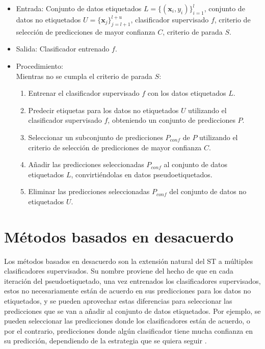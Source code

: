 \begin{algo}[Autoentrenamiento]
    \mbox{}
    \begin{itemize}
    \item Entrada: Conjunto de datos etiquetados $L = \{(\mathbf{x}_i, y_i)\}_{i=1}^l$, conjunto de datos no etiquetados $U = \{\mathbf{x}_j\}_{j=l+1}^{l+u}$, clasificador supervisado $f$, criterio de selección de predicciones de mayor confianza $C$, criterio de parada $S$.
    \item Salida: Clasificador entrenado $f$.
    \item Procedimiento:
        \\Mientras no se cumpla el criterio de parada $S$:
        \begin{enumerate}
            \item Entrenar el clasificador supervisado $f$ con los datos etiquetados $L$.
            \item Predecir etiquetas para los datos no etiquetados $U$ utilizando el clasificador supervisado $f$, obteniendo un conjunto de predicciones $P$.
            \item Seleccionar un subconjunto de predicciones $P_{conf}$ de $P$ utilizando el criterio de selección de predicciones de mayor confianza $C$.
            \item Añadir las predicciones seleccionadas $P_{conf}$ al conjunto de datos etiquetados $L$, convirtiéndolas en datos pseudoetiquetados.
            \item Eliminar las predicciones seleccionadas $P_{conf}$ del conjunto de datos no etiquetados $U$.
        \end{enumerate}
    \end{itemize}
\end{algo}

\section{Métodos basados en desacuerdo}

Los métodos basados en desacuerdo son la extensión natural del \gls{ST} a múltiples clasificadores supervisados. Su nombre proviene del hecho de que en cada iteración del pseudoetiquetado, una vez entrenados los clasificadores supervisados, estos no necesariamente están de acuerdo en sus predicciones para los datos no etiquetados, y se pueden aprovechar estas diferencias para seleccionar las predicciones que se van a añadir al conjunto de datos etiquetados. Por ejemplo, se pueden seleccionar las predicciones donde los clasificadores están de acuerdo, o por el contrario, predicciones donde algún clasificador tiene mucha confianza en su predicción, dependiendo de la estrategia que se quiera seguir \cite{zhou2010semi}.

